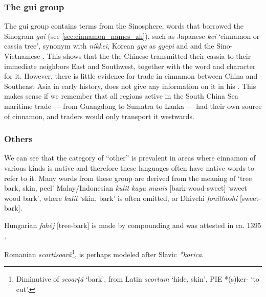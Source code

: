 \subsubsection{The gui group}

The gui group contains terms from the Sinosphere, words that borrowed the Sinogram  \textit{gui} (see \cref{sec:cinnamon_names_zh}), such as Japanese  \textit{kei} `cinnamon or cassia tree', synonym with  \textit{nikkei}, Korean  \textit{gye} as  \textit{gyepi} and  and the Sino-Vietnamese . This shows that the the Chinese transmitted their cassia to their immediate neighbors East and Southwest, together with the word and character for it. However, there is little evidence for trade in cinnamon between China and Southeast Asia in early history, \textcite{wang_nanhai_1958} does not give any information on it in his . \autocite{wang_nanhai_1958} This makes sense if we remember that all regions active in the South China Sea maritime trade --- from Guangdong to Sumatra to Lanka --- had their own source of cinnamon, and traders would only transport it westwards.

\subsubsection{Others}

We can see that the category of ``other'' is prevalent in areas where cinnamon of various kinds is native and therefore these languages often have native words to refer to it. Many words from these group are derived from the meaning of `tree bark, skin, peel' Malay/Indonesian \textit{kulit kayu manis} [bark-wood-sweet] `sweet wood bark', where \textit{kulit} `skin, bark' is often omitted, or Dhivehi \textit{fonithoshi} [sweet-bark]. 

Hungarian \textit{fahéj} [tree-bark] is made by compounding and was attested in ca. 1395 \autocite[s.v. fahéj]{zaicz_etimologiai_2006},

Romanian \textit{scorțișoară}\footnote{Diminutive of \textit{scoarță} `bark', from Latin \textit{scortum} `hide, skin', PIE *(s)ker- `to cut'.}, is perhaps modeled after Slavic \textit{*korica}.







